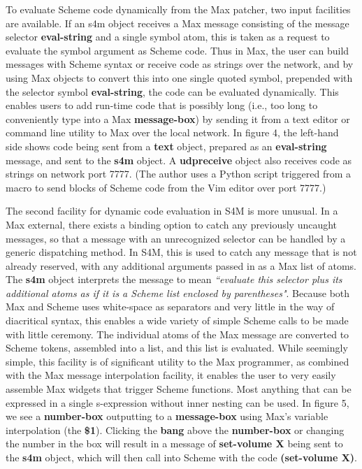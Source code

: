 \documentclass[acmsmall, anonymous, review]{acmart}
\begin{document}
To evaluate Scheme code dynamically from the Max patcher, two input facilities
are available. If an s4m object receives a Max message consisting of the 
message selector \textbf{eval-string} and a single symbol atom, 
this is taken as a request to evaluate the symbol argument as Scheme code. 
Thus in Max, the user can build messages
with Scheme syntax or receive code as strings over the network, and by
using Max objects to convert this into one single quoted symbol, prepended
with the selector symbol \textbf{eval-string}, the code can be evaluated dynamically.
This enables users to add run-time code that is possibly long 
(i.e., too long to conveniently type into a Max \textbf{message-box}) by
sending it from a text editor or command line utility to Max over the 
local network. In figure 4, the left-hand side shows code being sent
from a \textbf{text} object, prepared as an \textbf{eval-string} message, and sent to
the \textbf{s4m} object. A \textbf{udpreceive} object also receives code as strings
on network port 7777. (The author uses a Python script triggered
from a macro to send blocks of Scheme code from the Vim editor over port 7777.)

The second facility for dynamic code evaluation in S4M is more unusual.
In a Max external, there exists a binding option to catch any previously
uncaught messages, so that a message with an unrecognized selector 
can be handled by a generic dispatching method. In S4M, this is used to 
catch any message that is not already reserved, with any additional 
arguments passed in as a Max list of atoms.  The \textbf{s4m} object interprets
the message to mean \textit{``evaluate this selector plus its additional atoms 
as if it is a Scheme list enclosed by parentheses"}.
Because both Max and Scheme uses white-space as separators and very little
in the way of diacritical syntax, this enables a wide variety
of simple Scheme calls to be made with little ceremony. The
individual atoms of the Max message are converted to Scheme tokens,
assembled into a list, and this list is evaluated. While seemingly simple,
this facility is of significant utility to the Max programmer, as combined
with the Max message interpolation facility, it enables the user to very
easily assemble Max widgets that trigger Scheme functions. Most anything that
can be expressed in a single s-expression without inner nesting can be used.
In figure 5, we see a \textbf{number-box} outputting to a \textbf{message-box} using Max's 
variable interpolation (the \textbf{\$1}). 
Clicking the \textbf{bang} above the \textbf{number-box} or changing the number in 
the box will result in a message of 
\textbf{set-volume X} being sent to the \textbf{s4m} object, which will then call
into Scheme with the code \textbf{(set-volume X)}.
\end{document}
